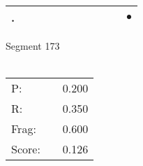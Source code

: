 \documentclass[landscape]{article}
\newcommand{\ssp}{\hspace{2pt}}
\newcommand{\mex}{\cellcolor{g}$\bullet$}
\begin{document}
\begin{tabular}{|l|p{10pt}|p{10pt}|p{10pt}|p{10pt}|p{10pt}|p{10pt}|p{10pt}|p{10pt}|p{10pt}|p{10pt}|}
\hline
\ssp \cellcolor{ref9}. \ssp&\hspace{2pt}&\hspace{2pt}&\hspace{2pt}&\hspace{2pt}&\hspace{2pt}&\hspace{2pt}&\hspace{2pt}&\hspace{2pt}&\hspace{2pt}&\hspace{2pt}\mex\\
\hline
\end{tabular}

\vspace{6pt}
\noindent Segment 173\\\\
\noindent\begin{tabular}{lm{12pt}r}
\hline
P:&&0.200\\
R:&&0.350\\
Frag:&&0.600\\
Score:&&0.126\\
\end{tabular}

\newpage
\end{document}
